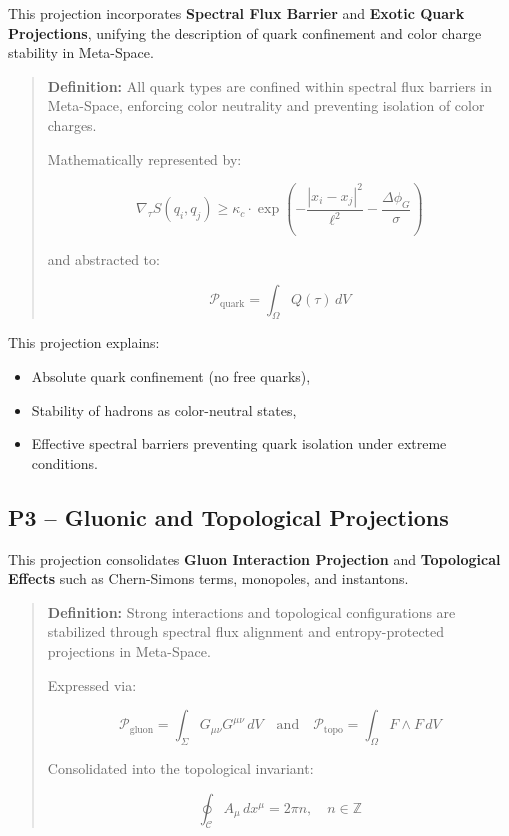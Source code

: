 \documentclass[10.5pt,a4paper]{article}
\begin{document}
This projection incorporates \textbf{Spectral Flux Barrier} and \textbf{Exotic Quark Projections}, 
unifying the description of quark confinement and color charge stability in Meta-Space.

\begin{quote}
\textbf{Definition:}  
All quark types are confined within spectral flux barriers in Meta-Space, enforcing color neutrality 
and preventing isolation of color charges.

Mathematically represented by:

\[
\nabla_\tau S(q_i, q_j) \geq \kappa_c \cdot \exp\left(-\frac{|x_i - x_j|^2}{\ell^2} - \frac{\Delta \phi_G}{\sigma}\right)
\]

and abstracted to:

\[
\mathcal{P}_{\text{quark}} = \int_\Omega Q(\tau) \, dV
\]
\end{quote}

This projection explains:
\begin{itemize}
    \item Absolute quark confinement (no free quarks),
    \item Stability of hadrons as color-neutral states,
    \item Effective spectral barriers preventing quark isolation under extreme conditions.
\end{itemize}

\subsection{P3 – Gluonic and Topological Projections}

This projection consolidates \textbf{Gluon Interaction Projection} and 
\textbf{Topological Effects} such as Chern-Simons terms, monopoles, and instantons.

\begin{quote}
\textbf{Definition:}  
Strong interactions and topological configurations are stabilized through spectral flux alignment 
and entropy-protected projections in Meta-Space.

Expressed via:

\[
\mathcal{P}_{\text{gluon}} = \int_\Sigma G_{\mu\nu} G^{\mu\nu} \, dV \quad \text{and} \quad \mathcal{P}_{\text{topo}} = \int_\Omega F \wedge F \, dV
\]

Consolidated into the topological invariant:

\[
\oint_{\mathcal{C}} A_\mu \, dx^\mu = 2\pi n, \quad n \in \mathbb{Z}
\]
\end{quote}
\end{document}
